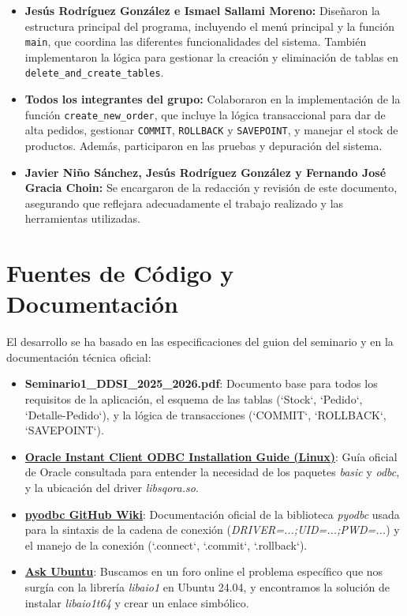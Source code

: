 \begin{itemize}
\begin{itemize}
        \item \textbf{Jesús Rodríguez González e Ismael Sallami Moreno:} Diseñaron la estructura principal del programa, incluyendo el menú principal y la función \texttt{main}, que coordina las diferentes funcionalidades del sistema. También implementaron la lógica para gestionar la creación y eliminación de tablas en \texttt{delete\_and\_create\_tables}.

        \item \textbf{Todos los integrantes del grupo:} Colaboraron en la implementación de la función \texttt{create\_new\_order}, que incluye la lógica transaccional para dar de alta pedidos, gestionar \texttt{COMMIT}, \texttt{ROLLBACK} y \texttt{SAVEPOINT}, y manejar el stock de productos. Además, participaron en las pruebas y depuración del sistema.
        
        \item \textbf{Javier Niño Sánchez, Jesús Rodríguez González y Fernando José Gracia Choin: }Se encargaron de la redacción y revisión de este documento, asegurando que reflejara adecuadamente el trabajo realizado y las herramientas utilizadas.
    \end{itemize}
\end{itemize}

\section{Fuentes de Código y Documentación}

El desarrollo se ha basado en las especificaciones del guion del seminario y en la documentación técnica oficial:

\begin{itemize}
    \item \textbf{Seminario1\_DDSI\_2025\_2026.pdf}: Documento base para todos los requisitos de la aplicación, el esquema de las tablas (`Stock`, `Pedido`, `Detalle-Pedido`), y la lógica de transacciones (`COMMIT`, `ROLLBACK`, `SAVEPOINT`).

  \item \textbf{\href{https://www.oracle.com/database/technologies/releasenote-odbc-ic.html}{Oracle Instant Client ODBC Installation Guide (Linux)}}: Guía oficial de Oracle consultada para entender la necesidad de los paquetes \textit{basic} y \textit{odbc}, y la ubicación del driver \textit{libsqora.so}.

    \item \textbf{\href{https://github.com/mkleehammer/pyodbc/wiki}{pyodbc GitHub Wiki}}: Documentación oficial de la biblioteca \textit{pyodbc} usada para la sintaxis de la cadena de conexión (\textit{DRIVER=...;UID=...;PWD=...}) y el manejo de la conexión (`.connect`, `.commit`, `.rollback`).

    \item \textbf{\href{https://askubuntu.com/questions/1512196/libaio1-on-noble}{Ask Ubuntu}}: Buscamos en un foro online el problema específico que nos surgía con la librería \textit{libaio1} en Ubuntu 24.04, y encontramos la solución de instalar \textit{libaio1t64} y crear un enlace simbólico.
\end{itemize}
